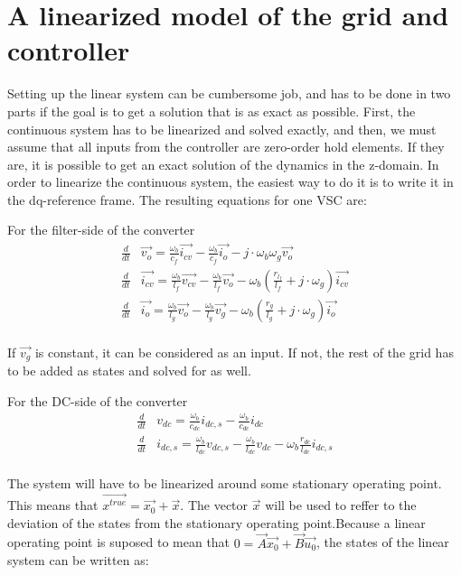 \chapter{A linearized model of the grid and controller}
\label{chp:linearize_the_system}
Setting up the linear system can be cumbersome job, and has to be done in two parts if the goal is to get a solution that is as exact as possible. First, the continuous system has to be linearized and solved exactly, and then, we must assume that all inputs from the controller are zero-order hold elements. If they are, it is possible to get an exact solution of the dynamics in the z-domain. In order to linearize the continuous system, the easiest way to do it is to write it in the dq-reference frame. The resulting equations for one VSC are: 

For the filter-side of the converter
\begin{align}
 \frac{d}{dt}&\Vec{v_o} = \frac{\omega_b}{c_f}\Vec{i_{cv}} - \frac{\omega_b}{c_f}\Vec{i_o} - j\cdot\omega_b \omega_g \Vec{v_o}\\
 \frac{d}{dt}&\Vec{i_{cv}} = \frac{\omega_b}{l_f}\Vec{v_{cv}} - \frac{\omega_b}{l_f}\Vec{v_o} -\omega_b \left( \frac{r_{l_f}}{l_f} + j\cdot \omega_g \right)\Vec{i_{cv}}\\
 \frac{d}{dt}&\Vec{i_o} = \frac{\omega_b}{l_g}\Vec{v_{o}} - \frac{\omega_b}{l_g}\Vec{v_g} -\omega_b \left( \frac{r_g}{l_g} + j\cdot \omega_g \right)\Vec{i_o}\\
\end{align}{}

If $\Vec{v_g}$ is constant, it can be considered as an input. If not, the rest of the grid has to be added as states and solved for as well. 

For the DC-side of the converter
\begin{align}
 \frac{d}{dt}&v_{dc} = \frac{\omega_b}{c_{dc}}i_{dc,s} - \frac{\omega_b}{c_{dc}}i_{dc}\\
 \frac{d}{dt}&i_{dc,s} = \frac{\omega_b}{l_{dc}}v_{dc,s} -\frac{\omega_b}{l_{dc}}v_{dc} - \omega_b \frac{ r_{dc}}{l_{dc}}i_{dc,s} \\
\end{align}{}


The system will have to be linearized around some stationary operating point. This means that $\Vec{x^{true}} = \Vec{x_0}+ \Vec{x}$. The vector $\Vec{x}$ will be used to reffer to the deviation of the states from the stationary operating point.Because a linear operating point is suposed to mean that $0 = \Vec{A}\Vec{x_0} + \Vec{B}\Vec{u_0}$, the states of the linear system can be written as:

